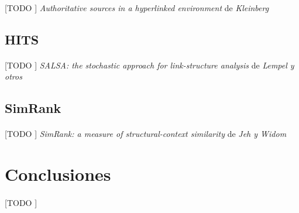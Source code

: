 \documentclass{subfiles}
\begin{document}
        \paragraph{}
        [TODO ] \emph{Authoritative sources in a hyperlinked environment} \cite{kleinberg1999authoritative} de \emph{Kleinberg}

      \subsection{HITS}
      \label{sec:hits}

        \paragraph{}
        [TODO ] \emph{SALSA: the stochastic approach for link-structure analysis}\cite{lempel2001salsa} de \emph{Lempel y otros}

      \subsection{SimRank}
      \label{sec:simrank}

        \paragraph{}
        [TODO ] \emph{SimRank: a measure of structural-context similarity} \cite{jeh2002simrank} de \emph{Jeh y Widom}

    \section{Conclusiones}
    \label{sec:pagerank_conclusions}

      \paragraph{}
      [TODO ]
\end{document}

